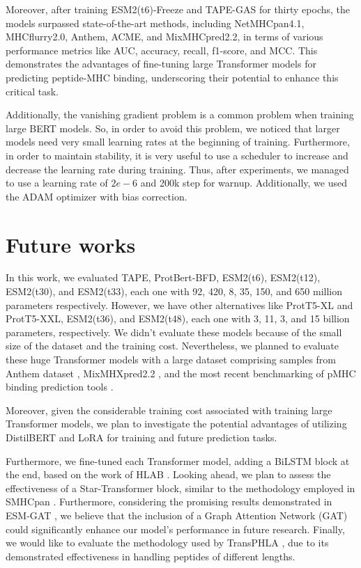 Moreover, after training ESM2(t6)-Freeze and TAPE-GAS for thirty epochs, the models surpassed state-of-the-art methods, including NetMHCpan4.1, MHCflurry2.0, Anthem, ACME, and MixMHCpred2.2, in terms of various performance metrics like AUC, accuracy, recall, f1-score, and MCC. This demonstrates the advantages of fine-tuning large Transformer models for predicting peptide-MHC binding, underscoring their potential to enhance this critical task.

Additionally, the vanishing gradient problem is a common problem when training large BERT models. So, in order to avoid this problem, we noticed that larger models need very small learning rates at the beginning of training. Furthermore, in order to maintain stability, it is very useful to use a scheduler to increase and decrease the learning rate during training. Thus, after experiments, we managed to use a learning rate of $2e-6$ and 200k step for warnup. Additionally, we used the ADAM optimizer with bias correction.

\section{Future works}
In this work, we evaluated TAPE, ProtBert-BFD, ESM2(t6), ESM2(t12), ESM2(t30), and ESM2(t33), each one with 92, 420, 8, 35, 150, and 650 million parameters respectively. However, we have other alternatives like ProtT5-XL and ProtT5-XXL, ESM2(t36), and ESM2(t48), each one with 3, 11, 3, and 15 billion parameters, respectively. We didn't evaluate these models because of the small size of the dataset and the training cost. Nevertheless, we planned to evaluate these huge Transformer models with a large dataset comprising samples from Anthem dataset \cite{mei2021anthem}, MixMHXpred2.2  \cite{gfeller2023improved}, and the most recent benchmarking of pMHC binding prediction tools \cite{wang2023comprehensive}.

Moreover, given the considerable training cost associated with training large Transformer models, we plan to investigate the potential advantages of utilizing DistilBERT \cite{sanh2019distilbert} and LoRA \cite{hu2021lora} for training and future prediction tasks.

Furthermore, we fine-tuned each Transformer model, adding a BiLSTM block at the end, based on the work of HLAB \cite{zhang2022hlab}. Looking ahead, we plan to assess the effectiveness of a Star-Transformer block, similar to the methodology employed in SMHCpan \cite{ye2023stmhcpan}. Furthermore, considering the promising results demonstrated in ESM-GAT \cite{hashemi2023improved}, we believe that the inclusion of a Graph Attention Network (GAT) could significantly enhance our model's performance in future research. Finally, we would like to evaluate the methodology used by TransPHLA \cite{chu2022transformer}, due to its demonstrated effectiveness in handling peptides of different lengths.